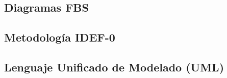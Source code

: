 \subsection{Diagramas FBS}

\subsection{Metodología IDEF-0}

\subsection{Lenguaje Unificado de Modelado (UML)}
